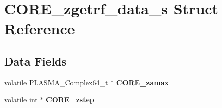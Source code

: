 \hypertarget{structCORE__zgetrf__data__s}{}\section{C\+O\+R\+E\+\_\+zgetrf\+\_\+data\+\_\+s Struct Reference}
\label{structCORE__zgetrf__data__s}
\subsection*{Data Fields}
\begin{DoxyCompactItemize}
\item 
\hypertarget{structCORE__zgetrf__data__s_a617a069e65c91789ea9fe0316da34e3d}{}volatile P\+L\+A\+S\+M\+A\+\_\+\+Complex64\+\_\+t $\ast$ {\bfseries C\+O\+R\+E\+\_\+zamax}\label{structCORE__zgetrf__data__s_a617a069e65c91789ea9fe0316da34e3d}

\item 
\hypertarget{structCORE__zgetrf__data__s_aeb2ff4c737e5805275befe40a1195d9e}{}volatile int $\ast$ {\bfseries C\+O\+R\+E\+\_\+zstep}\label{structCORE__zgetrf__data__s_aeb2ff4c737e5805275befe40a1195d9e}

\end{DoxyCompactItemize}
